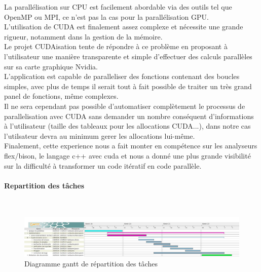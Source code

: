\documentclass{article}
\begin{document}
La parallélisation sur CPU est facilement abordable via des outils tel que OpenMP ou MPI, ce n'est pas la cas pour la parallélisation GPU.\\
	L'utilisation de CUDA est finalement assez complexe et nécessite une grande rigueur, notamment dans la gestion de la mémoire.\\
	Le projet CUDAisation tente de répondre à ce problème en proposant à l'utilisateur une manière transparente et simple d'effectuer des calculs parallèles sur sa carte graphique Nvidia.\\
	L'application est capable de paralleliser des fonctions contenant des boucles simples, avec plus de temps il serait tout à fait possible de traiter un très grand panel de fonctions, même complexes.\\
	Il ne sera cependant pas possible d'automatiser complètement le processus de parallelisation avec CUDA sans demander un nombre conséquent d'informations à l'utilisateur (taille des tableaux pour les allocations CUDA...), dans notre cas l'utilsateur devra au minimum gerer les allocations lui-même.\\	
	Finalement, cette experience nous a fait monter en compétence sur les analyseurs flex/bison, le langage c++ avec cuda et nous a donné une plus grande visibilité sur la difficulté à transformer un code itératif en code parallèle. 
		
	\paragraph{Repartition des tâches}	
	~~\\
\begin{figure}[h!]
		\hspace*{-1.18in}
		\includegraphics[scale=0.345]{Gantt/ganttPrev.jpg}
		\caption[Diagramme gantt de répartition des tâches]{Diagramme gantt de répartition des tâches}

  		\label{fig:gantt}
\end{figure}
	
\newpage
	
	
	
\printglossaries


\listoffigures
\end{document}
